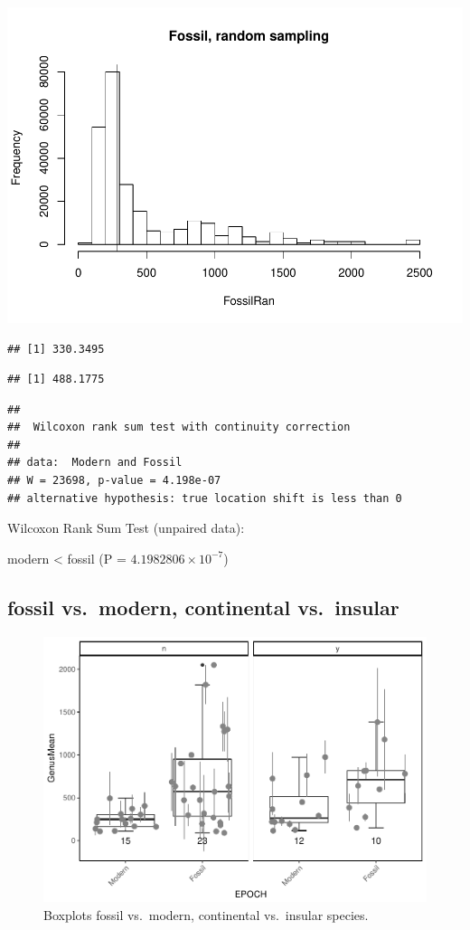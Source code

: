 \documentclass[]{article}
\begin{document}
\includegraphics{MA_JJ_files/figure-latex/RSFM-1.pdf}

\begin{verbatim}
## [1] 330.3495
\end{verbatim}

\begin{verbatim}
## [1] 488.1775
\end{verbatim}

\begin{verbatim}
## 
##  Wilcoxon rank sum test with continuity correction
## 
## data:  Modern and Fossil
## W = 23698, p-value = 4.198e-07
## alternative hypothesis: true location shift is less than 0
\end{verbatim}

Wilcoxon Rank Sum Test (unpaired data):

modern \textless{} fossil (P = \(4.1982806\times 10^{-7}\))

\newpage

\subsection{fossil vs.~modern, continental
vs.~insular}\label{fossil-vs.modern-continental-vs.insular}

\begin{figure}[htbp]
\centering
\includegraphics{MA_JJ_files/figure-latex/BPFMCI-1.pdf}
\caption{Boxplots fossil vs.~modern, continental vs.~insular species.}
\end{figure}
\end{document}
